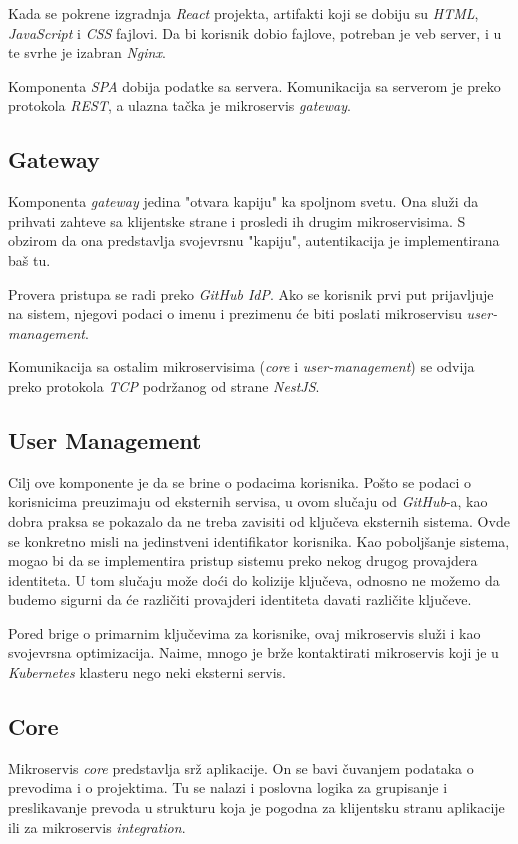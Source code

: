 Kada se pokrene izgradnja \textit{React} projekta, artifakti koji se dobiju 
su \textit{HTML}, \textit{JavaScript} i \textit{CSS} fajlovi. Da bi korisnik dobio fajlove, 
potreban je veb server, i u te svrhe je izabran \textit{Nginx}.

Komponenta \textit{SPA} dobija podatke sa servera. Komunikacija sa serverom 
je preko protokola \textit{REST}, a ulazna tačka je mikroservis \textit{gateway}.

\subsection{Gateway}
Komponenta \textit{gateway} jedina "otvara kapiju" ka spoljnom svetu.
Ona služi da prihvati zahteve sa klijentske strane i prosledi ih 
drugim mikroservisima. S obzirom da ona predstavlja svojevrsnu "kapiju",
autentikacija je implementirana baš tu.

Provera pristupa se radi preko \textit{GitHub IdP}. Ako se korisnik 
prvi put prijavljuje na sistem, njegovi podaci o imenu i prezimenu će 
biti poslati mikroservisu \textit{user-management}. 

Komunikacija sa ostalim mikroservisima (\textit{core} i \textit{user-management})
se odvija preko protokola \textit{TCP} podržanog od strane \textit{NestJS}.

\subsection{User Management}
Cilj ove komponente je da se brine o podacima korisnika. Pošto se podaci o korisnicima 
preuzimaju od eksternih servisa, u ovom slučaju od \textit{GitHub}-a, kao dobra praksa se 
pokazalo da ne treba zavisiti od ključeva eksternih sistema. 
Ovde se konkretno misli na jedinstveni identifikator korisnika. Kao 
poboljšanje sistema, mogao bi da se implementira pristup sistemu preko 
nekog drugog provajdera identiteta. U tom slučaju može doći do kolizije 
ključeva, odnosno ne možemo da budemo sigurni da će različiti provajderi identiteta 
davati različite ključeve.

Pored brige o primarnim ključevima za korisnike, ovaj mikroservis služi 
i kao svojevrsna optimizacija. Naime, mnogo je brže kontaktirati 
mikroservis koji je u \textit{Kubernetes} klasteru nego neki eksterni 
servis.

\subsection{Core}
Mikroservis \textit{core} predstavlja srž aplikacije. On se bavi čuvanjem 
podataka o prevodima i o projektima. Tu se nalazi i poslovna logika za 
grupisanje i preslikavanje prevoda u strukturu koja je pogodna za 
klijentsku stranu aplikacije ili za mikroservis \textit{integration}.

